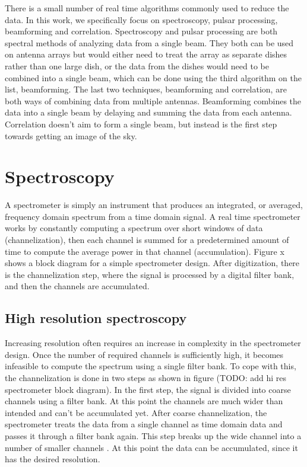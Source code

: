 There is a small number of real time algorithms commonly used to reduce the data. 
In this work, we specifically focus on spectroscopy, pulsar processing, beamforming and correlation. 
Spectroscopy and pulsar processing are both spectral methods of analyzing data from a single beam.
They both can be used on antenna arrays but would either need to treat the array as separate dishes rather than one large dish, or the data from the dishes would need to be combined into a single beam, which can be done using the third algorithm on the list, beamforming. 
The last two techniques, beamforming and correlation, are both ways of combining data from multiple antennas. 
Beamforming combines the data into a single beam by delaying and summing the data from each antenna.
Correlation doesn't aim to form a single beam, but instead is the first step towards getting an image of the sky. 




\section{Spectroscopy}
\label{Real Time Radio Astronomy Algorithms:Spectroscopy}
A spectrometer is simply an instrument that produces an integrated, or averaged, frequency domain spectrum from a time domain signal. 
A real time spectrometer works by constantly computing a spectrum over short windows of data (channelization), then each channel is summed for a predetermined amount of time to compute the average power in that channel (accumulation). 
Figure x shows a block diagram for a simple spectrometer design. 
After digitization, there is the channelization step, where the signal is processed by a digital filter bank, and then the channels are accumulated. 

\subsection{High resolution spectroscopy}
Increasing resolution often requires an increase in complexity in the spectrometer design. 
Once the number of required channels is sufficiently high, it becomes infeasible to compute the spectrum using a single filter bank. 
To cope with this, the channelization is done in two steps as shown in figure (TODO: add hi res spectrometer block diagram). 
In the first step, the signal is divided into coarse channels using a filter bank. 
At this point the channels are much wider than intended and can't be accumulated yet. 
After coarse channelization, the spectrometer treats the data from a single channel as time domain data and passes it through a filter bank again. 
This step breaks up the wide channel into a number of smaller channels . At this point the data can be accumulated, since it has the desired resolution.

